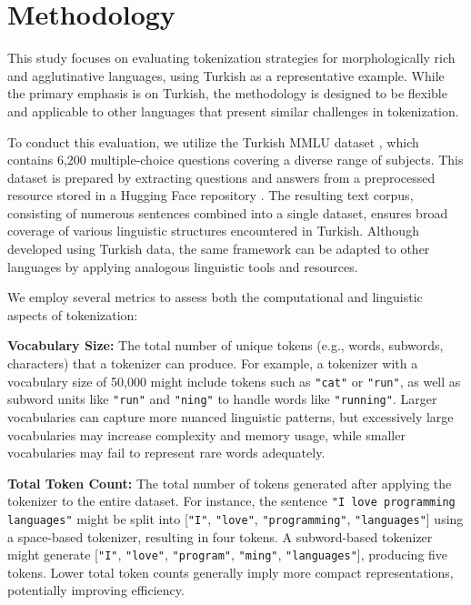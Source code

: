 \section{Methodology}

This study focuses on evaluating tokenization strategies for morphologically rich and agglutinative languages, using Turkish as a representative example. While the primary emphasis is on Turkish, the methodology is designed to be flexible and applicable to other languages that present similar challenges in tokenization.

To conduct this evaluation, we utilize the Turkish MMLU dataset \cite{bayram_turkish_nodate}, which contains 6,200 multiple-choice questions covering a diverse range of subjects. This dataset is prepared by extracting questions and answers from a preprocessed resource stored in a Hugging Face repository \cite{bayram_turkish_nodate}. The resulting text corpus, consisting of numerous sentences combined into a single dataset, ensures broad coverage of various linguistic structures encountered in Turkish. Although developed using Turkish data, the same framework can be adapted to other languages by applying analogous linguistic tools and resources.

We employ several metrics to assess both the computational and linguistic aspects of tokenization:

\textbf{Vocabulary Size:}  
The total number of unique tokens (e.g., words, subwords, characters) that a tokenizer can produce. For example, a tokenizer with a vocabulary size of 50,000 might include tokens such as \texttt{"cat"} or \texttt{"run"}, as well as subword units like \texttt{"run"} and \texttt{"ning"} to handle words like \texttt{"running"}. Larger vocabularies can capture more nuanced linguistic patterns, but excessively large vocabularies may increase complexity and memory usage, while smaller vocabularies may fail to represent rare words adequately.

\textbf{Total Token Count:}  
The total number of tokens generated after applying the tokenizer to the entire dataset. For instance, the sentence \texttt{"I love programming languages"} might be split into [\texttt{"I"}, \texttt{"love"}, \texttt{"programming"}, \texttt{"languages"}] using a space-based tokenizer, resulting in four tokens. A subword-based tokenizer might generate [\texttt{"I"}, \texttt{"love"}, \texttt{"program"}, \texttt{"ming"}, \texttt{"languages"}], producing five tokens. Lower total token counts generally imply more compact representations, potentially improving efficiency.


